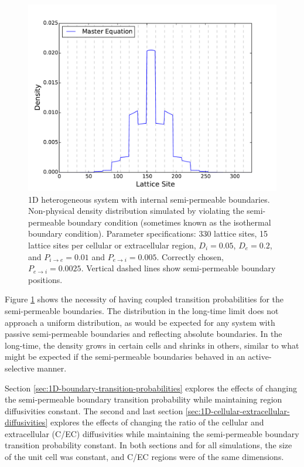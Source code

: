 	\begin{figure}[h]
		\centering
		\includegraphics[width=1.0\linewidth]{../images/1D/11U_heterogeneous_plots_1D_nonphysical}
		\caption{1D heterogeneous system with internal semi-permeable boundaries. Non-physical density distribution simulated by violating the semi-permeable boundary condition (sometimes known as the isothermal boundary condition). Parameter specifications: 330 lattice sites, 15 lattice sites per cellular or extracellular region, $ D_i = 0.05 $, $ D_e = 0.2 $, and $ P_{i\rightarrow e} = 0.01 $ and $ P_{e\rightarrow i} =  0.005 $. Correctly chosen, $ P_{e\rightarrow i} =  0.0025 $. Vertical dashed lines show semi-permeable boundary positions. }
		\label{fig:11U_heterogeneous_plots_1D_nonphysical}
	\end{figure}
	
	\newpage
	Figure \ref{fig:11U_heterogeneous_plots_1D_nonphysical} shows the necessity of having coupled transition probabilities for the semi-permeable boundaries. The distribution in the long-time limit does not approach a uniform distribution, as would be expected for any system with passive semi-permeable boundaries and reflecting absolute boundaries. In the long-time, the density grows in certain cells and shrinks in others, similar to what might be expected if the semi-permeable boundaries behaved in an active-selective manner. 
	
	\newpage
	Section \ref{sec:1D-boundary-transition-probabilities} explores the effects of changing the semi-permeable boundary transition probability while maintaining region diffusivities constant. The second and last section \ref{sec:1D-cellular-extracellular-diffusivities} explores the effects of changing the ratio of the cellular and extracellular (C/EC) diffusivities while maintaining the semi-permeable boundary transition probability constant. In both sections and for all simulations, the size of the unit cell was constant, and C/EC regions were of the same dimensions.
	
